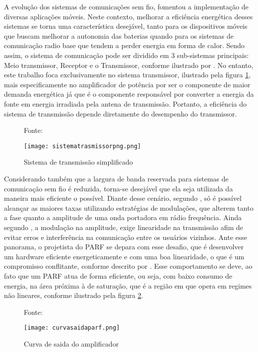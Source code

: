 A evolução dos sistemas de comunicações sem fio, fomentou a implementação de diversas aplicações móveis. Neste contexto, melhorar a eficiência energética desses sistemas se torna uma característica desejável, tanto para os dispositivos móveis que buscam melhorar a autonomia das baterias quando para os sistemas de comunicação radio base que tendem a perder energia em forma de calor.  
Sendo assim, o sistema de comunicação pode ser dividido em 3 sub-sistemas principais: Meio transmissor, Receptor e o Transmissor, conforme ilustrado por \cite{Schuartz2017}.
No entanto, este trabalho foca exclusivamente no sistema transmissor, ilustrado pela figura \ref{fig:sistemadetrasmissao}, mais especificamente no amplificador de potência por ser o  componente de maior demanda energética já que é o componente responsável por converter a energia da fonte em energia irradiada pela antena de transmissão. Portanto, a eficiência do sistema de transmissão depende diretamente do desempenho do transmissor. 

\begin{figure}[H]
    \centering
    \captionsetup{justification=centering}
    \caption*{Fonte: \cite{Schuartz2017}}
    \texttt{[image: sistematrasmissorpng.png]}
    \caption{Sistema de transmissão simplificado}
    \label{fig:sistemadetrasmissao}
\end{figure}

Considerando também que a largura de banda reservada para sistemas de comunicação sem fio é reduzida, torna-se desejável que ela seja utilizada da maneira mais eficiente o possível. Diante desse cenário, segundo \cite{Kenington2000}, só é possível alcançar as maiores taxas utilizando estratégias de modulações, que alterem tanto a fase quanto a amplitude de uma onda portadora em rádio frequência. Ainda segundo \cite{Kenington2000}, a modulação na amplitude, exige linearidade na transmissão afim de evitar erros e interferência na comunicação entre os usuários vizinhos. Ante esse panorama, o projetista do PARF se depara com esse desafio, que é desenvolver um hardware eficiente energeticamente e com uma boa linearidade, o que é um compromisso conflitante, conforme descrito por \cite{Cripps2006}. Esse comportamento se deve, ao fato que um PARF atua de forma eficiente, ou seja, com baixo consumo de energia, na área próxima à de saturação, que é a região em que opera em regimes não lineares, conforme ilustrado pela figura \ref{fig:saidaparf}.

\begin{figure}[H]
    \centering
    \captionsetup{justification=centering}
    \caption*{Fonte: \cite{Chavez2018}}
    \texttt{[image: curvasaidaparf.png]}
    \caption{Curva de saida do amplificador}
    \label{fig:saidaparf}
\end{figure}

